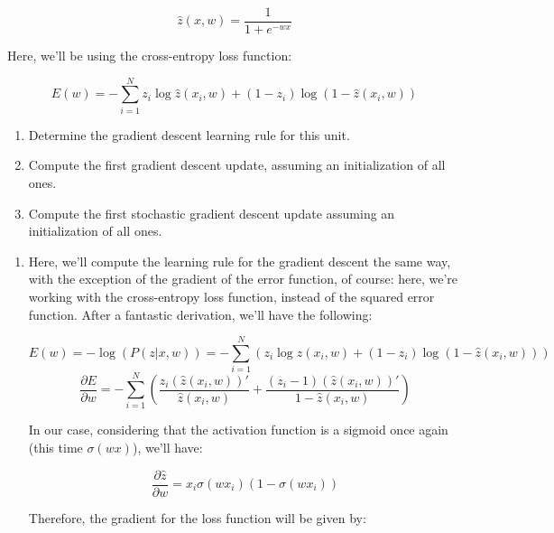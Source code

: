\documentclass[12pt]{article}
\begin{document}
\begin{enumerate}[leftmargin=\labelsep]
\begin{tcolorbox}[enhanced jigsaw,colback=bg,boxrule=0pt,arc=1pt,halign=center]
    \begin{equation*}
      \hat{z}(x, w) = \frac{1}{1 + e^{-w x}}
    \end{equation*}

    Here, we'll be using the cross-entropy loss function:

    \begin{equation*}
      E(w) = - \sum_{i=1}^N z_i \log \hat{z}(x_i, w) + (1 - z_i) \log (1 - \hat{z}(x_i, w))
    \end{equation*}

    \begin{enumerate}
      \item Determine the gradient descent learning rule for this unit.
      \item Compute the first gradient descent update, assuming an initialization of all ones.
      \item Compute the first stochastic gradient descent update assuming an initialization of all ones.
    \end{enumerate}
  \end{tcolorbox}

  \begin{enumerate}
    \item {
          Here, we'll compute the learning rule for the gradient descent the same way,
          with the exception of the gradient of the error function, of course: here,
          we're working with the cross-entropy loss function, instead of the squared
          error function. After a fantastic derivation, we'll have the following:

          $$
            E(w) = - \log(P(z|x, w)) = - \sum_{i=1}^N (z_i \log \hat{z}(x_i, w) + (1 - z_i) \log (1 - \hat{z}(x_i, w)))
          $$
          $$
            \frac{\partial E}{\partial w} = - \sum_{i=1}^N \left(
            \frac{z_i (\hat{z}(x_i, w))'}{\hat{z}(x_i, w)} + \frac{(z_i - 1) (\hat{z}(x_i, w))'}{1 - \hat{z}(x_i, w)}
            \right)
          $$

          In our case, considering that the activation function is a sigmoid once again
          (this time $\sigma(wx)$), we'll have:

          $$
            \frac{\partial \hat{z}}{\partial w} = x_i \sigma(w x_i) (1 - \sigma(w x_i))
          $$

          Therefore, the gradient for the loss function will be given by:

}
\end{enumerate}
\end{enumerate}
\end{document}
